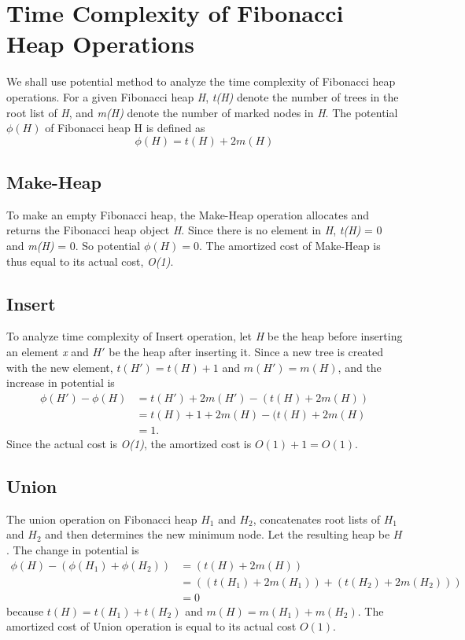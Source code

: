 \documentclass[12pt, a4paper]{article}
\begin{document}
	
	
	\pagebreak
	
	
	
	
	\section{Time Complexity of Fibonacci Heap Operations}
	We shall use potential method to analyze the time complexity of Fibonacci heap operations. For a given Fibonacci heap \textit{H}, \textit{t(H)} denote the number of trees in the root list of \textit{H}, and \textit{m(H)} denote the number of marked nodes in \textit{H}. The potential $\phi(H)$ of Fibonacci heap H is defined as $$\phi(H) = t(H) + 2m(H)$$
	\subsection{Make-Heap}
	To make an empty Fibonacci heap, the Make-Heap operation allocates and returns the Fibonacci heap object \textit{H}. Since there is no element in \textit{H}, \textit{t(H)} = 0 and \textit{m(H)} = 0. So potential $\phi(H) = 0$. The amortized cost of Make-Heap is thus equal to its actual cost, \textit{O(1)}.
	
	\subsection{Insert}
	To analyze time complexity of Insert operation, let \textit{H} be the heap before inserting an element \textit{x} and $H'$ be the heap after inserting it. Since a new tree is created with the new element, $t(H') = t(H) + 1$ and $m(H') = m(H)$, and the increase in potential is 
	\begin{equation*}
	\begin{split}
	\phi(H') - \phi(H) &= t(H') + 2m(H') - (t(H) + 2m(H))\\
	&  = t(H) + 1 + 2m(H) - (t(H) + 2m(H) \\ &= 1.
	\end{split}
	\end{equation*}
	Since the actual cost is \textit{O(1)}, the amortized cost is $O(1) + 1 = O(1).$
	
	\subsection{Union}
	The union operation on Fibonacci heap $H_1$ and $H_2$, concatenates root lists of $H_1$ and $H_2$ and then determines the new minimum node. Let the resulting heap be $H$. The change in potential is 
	\begin{equation*}
		\begin{split}
		\phi(H) - (\phi(H_1) + \phi(H_2)) &
			= (t(H) + 2m(H)) \\ &
			= ((t(H_1) + 2m(H_1)) + (t(H_2) + 2m(H_2))) \\ &
			= 0
		\end{split}
	\end{equation*}
	because $t(H) = t(H_1) + t(H_2)$ and $m(H) = m(H_1) + m(H_2)$. The amortized cost of Union operation is equal to its actual cost $O(1)$.
	
\end{document}
